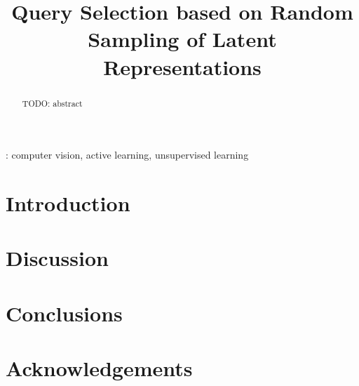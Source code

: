 \documentclass[a4paper]{article}
\title{Query Selection based on Random Sampling of Latent Representations}
\begin{document}
\maketitle
% 
\begin{abstract}
  TODO: abstract
\end{abstract}
: computer vision, active learning, unsupervised
learning

\section{Introduction}
\label{sec:introduction}


\section{Discussion}
\label{sec:discussion}
  

\section{Conclusions}
\label{sec:conclusion}

\section{Acknowledgements}
\label{sec:acknowledgements}


\newpage
\eightpt



\end{document}
